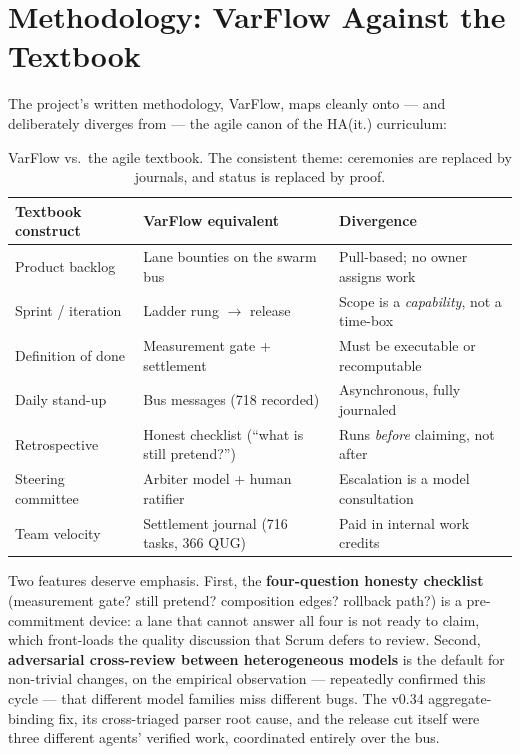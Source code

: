 \section{Methodology: VarFlow Against the Textbook}
\label{sec:method}

The project's written methodology, VarFlow, maps cleanly onto --- and deliberately diverges from --- the agile canon of the HA(it.) curriculum:

\begin{table}[h]
\centering
\small
\begin{tabular}{@{}p{4.2cm}p{4.6cm}p{5.6cm}@{}}
\toprule
\textbf{Textbook construct} & \textbf{VarFlow equivalent} & \textbf{Divergence} \\
\midrule
Product backlog & Lane bounties on the swarm bus & Pull-based; no owner assigns work \\
Sprint / iteration & Ladder rung $\rightarrow$ release & Scope is a \emph{capability}, not a time-box \\
Definition of done & Measurement gate + settlement & Must be executable or recomputable \\
Daily stand-up & Bus messages (718 recorded) & Asynchronous, fully journaled \\
Retrospective & Honest checklist (``what is still pretend?'') & Runs \emph{before} claiming, not after \\
Steering committee & Arbiter model + human ratifier & Escalation is a model consultation \\
Team velocity & Settlement journal (716 tasks, 366 QUG) & Paid in internal work credits \\
\bottomrule
\end{tabular}
\caption{VarFlow vs.\ the agile textbook. The consistent theme: ceremonies are replaced by journals, and status is replaced by proof.}
\label{tab:varflow}
\end{table}

Two features deserve emphasis. First, the \textbf{four-question honesty checklist} (measurement gate? still pretend? composition edges? rollback path?) is a pre-commitment device: a lane that cannot answer all four is not ready to claim, which front-loads the quality discussion that Scrum defers to review. Second, \textbf{adversarial cross-review between heterogeneous models} is the default for non-trivial changes, on the empirical observation --- repeatedly confirmed this cycle --- that different model families miss different bugs. The v0.34 aggregate-binding fix, its cross-triaged parser root cause, and the release cut itself were three different agents' verified work, coordinated entirely over the bus.

